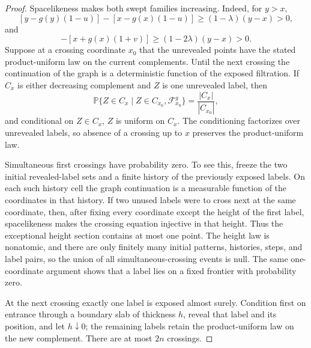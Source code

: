 \documentclass[11pt,reqno]{amsart}
\theoremstyle{definition}
\theoremstyle{remark}
\numberwithin{equation}{section}
\newcommand{\Pp}{\mathbb P}
\begin{document}
\begin{proof}
Spacelikeness makes both swept families increasing.  Indeed, for \(y>x\),
\[
[y-g(y)(1-u)]-[x-g(x)(1-u)]
\ge(1-\lambda)(y-x)>0,
\]
and
\begin{equation}
[y+g(y)(1+v)]-[x+g(x)(1+v)]
\ge(1-2\lambda)(y-x)>0.
\label{eq:1.8}
\end{equation}
Suppose at a crossing coordinate \(x_0\) that the unrevealed points have
the stated product-uniform law on the current complements.  Until the
next crossing the continuation of the graph is a deterministic function
of the exposed filtration.  If \(C_x\) is either decreasing complement and
\(Z\) is one unrevealed label, then
\[
\Pp\{Z\in C_x\mid Z\in C_{x_0},\mathcal F_{x_0}^g\}
=\frac{|C_x|}{|C_{x_0}|},
\]
and conditional on \(Z\in C_x\), \(Z\) is uniform on \(C_x\).
The conditioning factorizes over unrevealed labels, so absence of a
crossing up to \(x\) preserves the product-uniform law.

Simultaneous first crossings have probability zero.  To see this, freeze
the two initial revealed-label sets and a finite history of the previously
exposed labels.  On each such history cell
the graph continuation is a measurable function of the coordinates in that
history.  If two unused labels were to cross next at the same coordinate,
then, after fixing every coordinate except the height of the first label,
spacelikeness makes the crossing equation injective in that height.  Thus
the exceptional height section contains at most one point.  The height law
is nonatomic, and there are only finitely many initial patterns, histories,
steps, and label pairs, so the union of all simultaneous-crossing events is
null.  The same one-coordinate argument shows that a label lies on a fixed
frontier with probability zero.

At the next crossing exactly one label is exposed almost surely.
Condition first on entrance through a boundary slab of thickness \(h\),
reveal that label and its position, and let \(h\downarrow0\); the
remaining labels retain the product-uniform law on the new complement.
There are at most \(2n\) crossings.


\end{proof}
\end{document}
